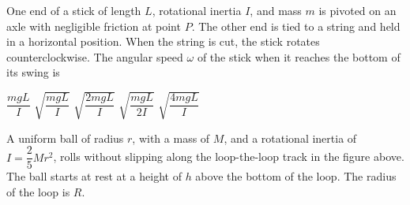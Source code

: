 \documentclass{../../../oss-apphys-exam}
\begin{document}
\begin{questions}
  \question One end of a stick of length $L$, rotational inertia $I$, and mass
  $m$ is pivoted on an axle with negligible friction at point $P$. The other
  end is tied to a string and held in a horizontal position. When the string is
  cut, the stick rotates counterclockwise. The angular speed $\omega$ of the
  stick when it reaches the bottom of its swing is
  \begin{choices}
    \choice $\dfrac{mgL}I$
    \choice $\sqrt{\dfrac{mgL}I}$
    \choice $\sqrt{\dfrac{2mgL}I}$
    \choice $\sqrt{\dfrac{mgL}{2I}}$
    \choice $\sqrt{\dfrac{4mgL}I}$
  \end{choices}
  \newpage



%

  \question A uniform ball of radius $r$, with a mass of $M$, and a rotational
  inertia of $I=\dfrac25Mr^2$, rolls without slipping along the loop-the-loop
  track in the figure above. The ball starts at rest at a height of $h$ above
  the bottom of the loop. The radius of the loop is $R$.
  \begin{parts}

\end{parts}
\end{questions}
\end{document}
